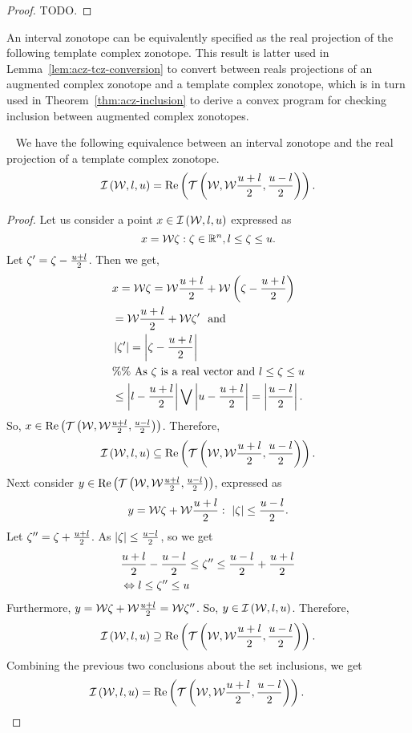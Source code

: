 %
\begin{proof}
{\color{red} TODO}.
\end{proof}
%
An interval zonotope can be equivalently specified as the real
projection of the following template complex zonotope.  This result is
latter used in Lemma~\ref{lem:acz-tcz-conversion} to convert between
reals projections of an augmented complex zonotope and a template
complex zonotope, which is in turn used in
Theorem~\ref{thm:acz-inclusion} to derive a convex program for checking
inclusion between augmented complex zonotopes.
%
\begin{lemma}~\label{lem:iz-tcz-conversion}
We have the following equivalence between an interval zonotope and the
real projection of a template complex zonotope.
%
\[
\mathit{\operatorname{\mathcal{I}}}\left(\mathcal{W},l,u\right)=\operatorname{Re}\left(\mathit{\operatorname{\mathcal{T}}}\left(\mathcal{W},\mathcal{W}\frac{u+l}{2},\frac{u-l}{2}\right)\right).
\]
%
\end{lemma}
%
\begin{proof}
Let us consider a point $x\in\mathit{\operatorname{\mathcal{I}}}\left(\mathcal{W},l,u\right)$ expressed as
%
\[
x=\mathcal{W}\zeta:\zeta\in\mathbb{R}^n,l\leq\zeta\leq u.
\]
%
  Let $\zeta^\prime=
\zeta-\frac{u+l}{2}$.
Then we get,
%
\begin{align*}
& x=\mathcal{W}\zeta=\mathcal{W}\frac{u+l}{2}+\mathcal{W}\left(\zeta-\frac{u+l}{2}\right)\\
& = \mathcal{W}\frac{u+l}{2}+\mathcal{W}\zeta^\prime~~\text{and}\\
& \left|\zeta^\prime\right|=\left|\zeta-\frac{u+l}{2}\right|\\
& \%\%~\text{As $\zeta$ is a real vector and $l\leq\zeta\leq u$}\\
& \leq \left|l-\frac{u+l}{2}\right|\bigvee \left|u-\frac{u+l}{2}\right|
= \left|\frac{u-l}{2}\right|.
\end{align*}
%
So,
$x\in\operatorname{Re}\left(\mathit{\operatorname{\mathcal{T}}}\left(\mathcal{W},\mathcal{W}\frac{u+l}{2},\frac{u-l}{2}\right)\right)$.  Therefore,
%
\[
\mathit{\operatorname{\mathcal{I}}}\left(\mathcal{W},l,u\right)\subseteq\operatorname{Re}\left(\mathit{\operatorname{\mathcal{T}}}\left(\mathcal{W},\mathcal{W}\frac{u+l}{2},\frac{u-l}{2}\right)\right).
\]
%
Next consider $y\in\operatorname{Re}\left(\mathit{\operatorname{\mathcal{T}}}\left(\mathcal{W},\mathcal{W}\frac{u+l}{2},\frac{u-l}{2}\right)\right)$,
expressed as
\[
y=\mathcal{W}\zeta+\mathcal{W}\frac{u+l}{2}:~\left|\zeta\right|\leq\frac{u-l}{2}.
\]
%
Let $\zeta^{\prime\prime}=\zeta+\frac{u+l}{2}$.
As
$\left|\zeta\right|\leq\frac{u-l}{2}$, so we get
%
\begin{align*}
&
\frac{u+l}{2}-\frac{u-l}{2}\leq\zeta^{\prime\prime}\leq\frac{u-l}{2}+\frac{u+l}{2}\\
& \Leftrightarrow l\leq\zeta^{\prime\prime}\leq u
\end{align*}
%
Furthermore, $y=\mathcal{W}\zeta+\mathcal{W}\frac{u+l}{2}=\mathcal{W}\zeta^{\prime\prime}$.
So, $y\in\mathit{\operatorname{\mathcal{I}}}\left(\mathcal{W},l,u\right)$.  Therefore,
%
\[
\mathit{\operatorname{\mathcal{I}}}\left(\mathcal{W},l,u\right)\supseteq\operatorname{Re}\left(\mathit{\operatorname{\mathcal{T}}}\left(\mathcal{W},\mathcal{W}\frac{u+l}{2},\frac{u-l}{2}\right)\right).
\]
%
Combining the previous two conclusions about the set inclusions, we get
%
\[
\mathit{\operatorname{\mathcal{I}}}\left(\mathcal{W},l,u\right)=\operatorname{Re}\left(\mathit{\operatorname{\mathcal{T}}}\left(\mathcal{W},\mathcal{W}\frac{u+l}{2},\frac{u-l}{2}\right)\right).~~~~~~\qedhere
\]
%
\end{proof}
